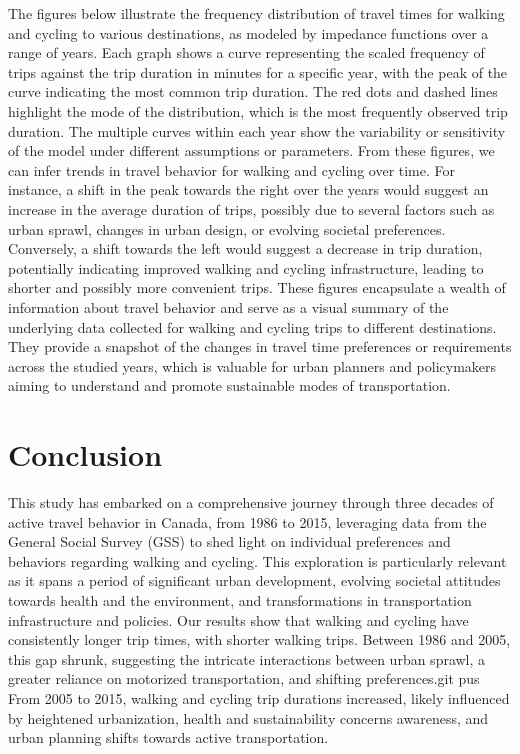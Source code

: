 \documentclass[
11pt, %
oneside, %
english, %
singlespacing, %
]{macthesis} %
\begin{document}
The figures below illustrate the frequency distribution of travel times for walking and cycling to various destinations, as modeled by impedance functions over a range of years. Each graph shows a curve representing the scaled frequency of trips against the trip duration in minutes for a specific year, with the peak of the curve indicating the most common trip duration. The red dots and dashed lines highlight the mode of the distribution, which is the most frequently observed trip duration. The multiple curves within each year show the variability or sensitivity of the model under different assumptions or parameters.
From these figures, we can infer trends in travel behavior for walking and cycling over time. For instance, a shift in the peak towards the right over the years would suggest an increase in the average duration of trips, possibly due to several factors such as urban sprawl, changes in urban design, or evolving societal preferences. Conversely, a shift towards the left would suggest a decrease in trip duration, potentially indicating improved walking and cycling infrastructure, leading to shorter and possibly more convenient trips.
These figures encapsulate a wealth of information about travel behavior and serve as a visual summary of the underlying data collected for walking and cycling trips to different destinations. They provide a snapshot of the changes in travel time preferences or requirements across the studied years, which is valuable for urban planners and policymakers aiming to understand and promote sustainable modes of transportation.

\hypertarget{conclusion}{%
\chapter*{Conclusion}\label{conclusion}}

This study has embarked on a comprehensive journey through three decades of active travel behavior in Canada, from 1986 to 2015, leveraging data from the General Social Survey (GSS) to shed light on individual preferences and behaviors regarding walking and cycling. This exploration is particularly relevant as it spans a period of significant urban development, evolving societal attitudes towards health and the environment, and transformations in transportation infrastructure and policies.
Our results show that walking and cycling have consistently longer trip times, with shorter walking trips. Between 1986 and 2005, this gap shrunk, suggesting the intricate interactions between urban sprawl, a greater reliance on motorized transportation, and shifting preferences.git pus From 2005 to 2015, walking and cycling trip durations increased, likely influenced by heightened urbanization, health and sustainability concerns awareness, and urban planning shifts towards active transportation.
\end{document}
